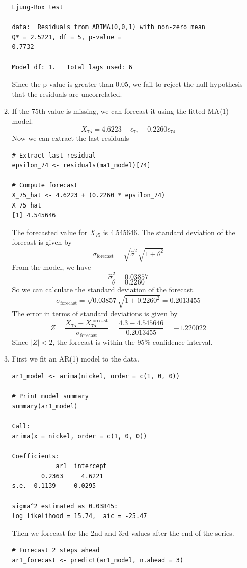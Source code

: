 \documentclass[12pt]{article}
\begin{document}
\begin{enumerate}
\begin{enumerate}
\begin{verbatim}
Ljung-Box test

data:  Residuals from ARIMA(0,0,1) with non-zero mean
Q* = 2.5221, df = 5, p-value =
0.7732

Model df: 1.   Total lags used: 6
\end{verbatim}
    Since the p-value is greater than 0.05, we fail to reject the null hypothesis that the residuals are uncorrelated.
    \item If the 75th value is missing, we can forecast it using the fitted
    MA(1) model.
    \[
        X_{75} = 4.6223 + \epsilon_{75} + 0.2260 \epsilon_{74}
    \]
    Now we can extract the last residuals
\begin{verbatim}
# Extract last residual
epsilon_74 <- residuals(ma1_model)[74]

# Compute forecast
X_75_hat <- 4.6223 + (0.2260 * epsilon_74)
X_75_hat
[1] 4.545646
\end{verbatim}
    The forecasted value for $X_{75}$ is 4.545646.
    The standard deviation of the forecast is given by
    \[
        \sigma_{\text{forecast}} = \sqrt{\hat{\sigma}^2} \sqrt{1 + \theta^2}
    \]
    From the model, we have 
    \[
        \hat{\sigma}^2 = 0.03857
    \]
    \[
        \theta = 0.2260
    \]
    So we can calculate the standard deviation of the forecast.
    \[
        \sigma_{\text{forecast}} = \sqrt{0.03857} \sqrt{1 + 0.2260^2} = 0.2013455
    \]
    The error in terms of standard deviations is given by
    \[
        Z = \frac{X_{75} - X_{75}^{\text{forecast}}}{\sigma_{\text{forecast}}}
        = \frac{4.3 - 4.545646}{0.2013455} = -1.220022
    \]
    Since $|Z| < 2$, the forecast is within the 95\% confidence interval.

    \item First we fit an AR(1) model to the data.
\begin{verbatim}
ar1_model <- arima(nickel, order = c(1, 0, 0))

# Print model summary
summary(ar1_model)

Call:
arima(x = nickel, order = c(1, 0, 0))

Coefficients:
            ar1  intercept
        0.2363     4.6221
s.e.  0.1139     0.0295

sigma^2 estimated as 0.03845:  
log likelihood = 15.74,  aic = -25.47
\end{verbatim}
    Then we forecast for the 2nd and 3rd values after the end of
    the series.
\begin{verbatim}
# Forecast 2 steps ahead
ar1_forecast <- predict(ar1_model, n.ahead = 3)


\end{verbatim}
\end{enumerate}
\end{enumerate}
\end{document}
